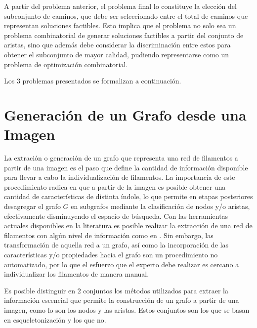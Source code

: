 A partir del problema anterior, el problema final lo constituye la elecci\'on del subconjunto de caminos, que debe ser seleccionado entre el total de caminos que representan soluciones factibles. Esto implica que el problema no solo sea un problema combinatorial de generar soluciones factibles a partir del conjunto de aristas, sino que adem\'as debe considerar la discriminaci\'on entre estos para obtener el subconjunto de mayor calidad, pudiendo representarse como un problema de optimizaci\'on combinatorial.

Los 3 problemas presentados se formalizan a continuaci\'on.


\section{Generaci\'on de un Grafo desde una Imagen}
La extraci\'on o generaci\'on de un grafo que representa una red de filamentos a partir de una imagen es el paso que define la cantidad de informaci\'on disponible para llevar a cabo la individualizaci\'on de filamentos. La importancia de este procedimiento radica en que a partir de la imagen es posible obtener una cantidad de caracter\'isticas de distinta \'indole, lo que permite en etapas posteriores desagregar el grafo $G$ en subgrafos mediante la clasificaci\'on de nodos y/o aristas, efectivamente disminuyendo el espacio de b\'usqueda. Con las herramientas actuales disponibles en la literatura es posible realizar la extracci\'on de una red de filamentos con algún nivel de informaci\'on como en \cite{xu2015soax}. Sin embargo, las transformaci\'on de aquella red a un grafo, as\'i como la incorporaci\'on de las caracter\'isticas y/o propiedades hacia el grafo son un procedimiento no automatizado, por lo que el esfuerzo que el experto debe realizar es cercano a individualizar los filamentos de manera manual.

Es posible distinguir en 2 conjuntos los m\'etodos utilizados para extraer la informaci\'on escencial que permite la construcci\'on de un grafo a partir de una imagen, como lo son los nodos y las aristas. Estos conjuntos son los que se basan en esqueletonizaci\'on\cite{lavado2018comparacion} y los que no. 

